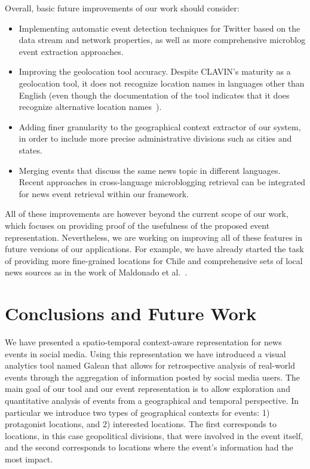 Overall, basic future improvements of our work should consider:
%
\begin{itemize}
\item Implementing automatic event detection techniques for Twitter based on the
data stream and network properties, as well as more comprehensive microblog
event extraction approaches.

\item Improving the geolocation tool accuracy. Despite CLAVIN's maturity as a
geolocation tool, it does not recognize location names in languages other than
English (even though the documentation of the tool indicates that it does
recognize alternative location names~\cite{clavin}).

\item Adding finer granularity to the geographical context extractor of our
system, in order to include more precise administrative divisions such as cities
and states.

\item Merging events that discuss the same news topic in different languages.
Recent approaches in cross-language microblogging retrieval
\cite{Godavarthy2016} can be integrated for news event retrieval within our
framework.
\end{itemize}

All of these improvements are however beyond the current scope of our work,
which focuses on providing proof of the usefulness of the proposed event
representation. 
%
Nevertheless, we are working on improving all of these features in future
versions of our applications.  
%
For example, we have already started the task of providing more fine-grained
locations for Chile and comprehensive sets of local news sources as in the work
of Maldonado et al.~\cite{maldonado2015spatio}.



\section{Conclusions and Future Work} \label{sec:conclusions}


We have presented a spatio-temporal context-aware representation for news events
in social media. 
%
Using this representation we have introduced a visual analytics tool named
Galean that allows for retrospective analysis of real-world events through the
aggregation of information posted by social media users. 
%
The main goal of our tool and our event representation is to allow exploration
and quantitative analysis of events from a geographical and temporal
perspective. 
%
In particular we introduce two types of geographical contexts for events: 1)
protagonist locations, and 2) interested locations. 
%
The first corresponds to locations, in this case geopolitical divisions, that
were involved in the event itself, and the second corresponds to locations where
the event's information had the most impact.


